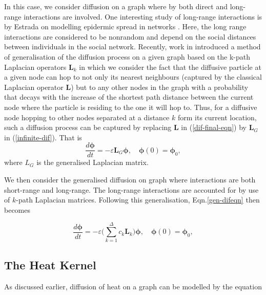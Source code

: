 \documentclass[10pt,a4paper]{article}
\begin{document}
        In this case, we consider diffusion on a graph where by both direct and long-range interactions are involved. One interesting study of long-range interactions is by Estrada on modelling epidermic spread in networks \citep{estrada2011epidemic}. Here, the long range interactions are considered to be nonrandom and depend on the social distances between individuals in the social network.
        Recently, work in \citep{estrada2012path} introduced a method of generalisation of the diffusion process on a given graph based on the k-path Laplacian operators $\mathbf{L}_k$ in which we consider the fact that the diffusive particle at a given node can hop to not only its nearest neighbours (captured by the classical Laplacian operator $\mathbf{L}$) but to any other nodes in the graph with a probability that decays with the increase of the shortest path distance between the current node where the particle is residing to the one it will hop to. Thus, for a diffusive node hopping to other nodes separated at a distance $k$ form its current location, such a diffusion process can be captured by replacing $\mathbf{L}$ in (\ref{dif-final-eqn}) by $\mathbf{L}_G$ in (\ref{infinite-dif}). That is 
        \begin{equation}
        \frac{d\boldsymbol{\phi}}{dt} = -\varepsilon \mathbf{L}_{G}\boldsymbol{\phi}, \quad \boldsymbol{\phi}(0) = \boldsymbol{\phi}_0 ,
        \label{gen-difeqn}
        \end{equation}
        where $L_G$ is the generalised Laplacian matrix. 
        
        
        We then consider the generalised diffusion on graph where interactions are both short-range and long-range. The long-range interactions are accounted for by use of $k$-path Laplacian matrices. Following this generalisation, Eqn.\ref{gen-difeqn} then becomes
        
        \begin{equation}
        \frac{d\boldsymbol{\phi}}{dt} =  -\varepsilon \Big(\sum_{k=1}^{\Delta}c_k\mathbf{L}_{k} \Big) \boldsymbol{\phi}, \quad \boldsymbol{\phi}(0) = \boldsymbol{\phi}_0 ,
        \label{kgen-difeqn}
        \end{equation}
        
        \subsection{The Heat Kernel}
        As discussed earlier, diffusion of heat on a graph can be modelled by the equation 
        
\end{document}
